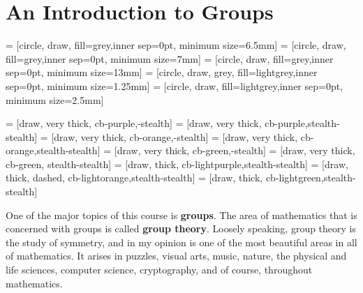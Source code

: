 \chapter{An Introduction to Groups}
\label{chapter:intro_groups}

 = [circle, draw, fill=grey,inner sep=0pt, minimum size=6.5mm]
 = [circle, draw, fill=grey,inner sep=0pt, minimum size=7mm]
 = [circle, draw, fill=grey,inner sep=0pt, minimum size=13mm]
 = [circle, draw, grey, fill=lightgrey,inner sep=0pt, minimum size=1.25mm]
 = [circle, draw, fill=lightgrey,inner sep=0pt, minimum size=2.5mm]

 = [draw, very thick, cb-purple,-stealth]
 = [draw, very thick, cb-purple,stealth-stealth]
 = [draw, very thick, cb-orange,-stealth]
 = [draw, very thick, cb-orange,stealth-stealth]
 = [draw, very thick, cb-green,-stealth]
 = [draw, very thick, cb-green, stealth-stealth]
 = [draw, thick, cb-lightpurple,stealth-stealth]
 = [draw, thick, dashed, cb-lightorange,stealth-stealth]
 = [draw, thick, cb-lightgreen,stealth-stealth]


One of the major topics of this course is \textbf{groups}.  The area of mathematics that is concerned with groups is called \textbf{group theory}. Loosely speaking, group theory is the study of symmetry, and in my opinion is one of the most beautiful areas in all of mathematics. It arises in puzzles, visual arts, music, nature, the physical and life sciences, computer science, cryptography, and of course, throughout mathematics.


